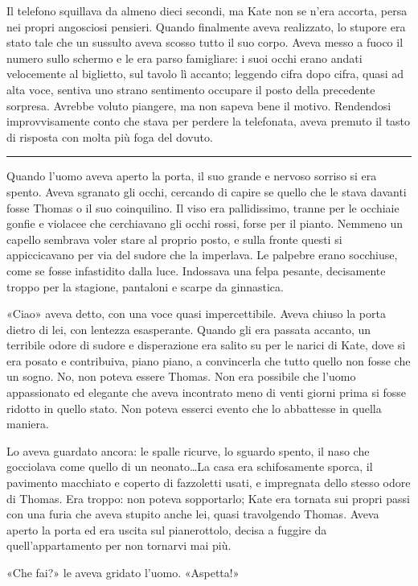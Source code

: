 \documentclass[a4paper,oneside,11pt]{memoir}
\begin{document}
Il telefono squillava da almeno dieci secondi, ma Kate non se n'era accorta,
persa nei propri angosciosi pensieri. Quando finalmente aveva realizzato, lo
stupore era stato tale che un sussulto aveva scosso tutto il suo corpo. Aveva
messo a fuoco il numero sullo schermo e le era parso famigliare: i suoi occhi
erano andati velocemente al biglietto, sul tavolo lì accanto; leggendo cifra
dopo cifra, quasi ad alta voce, sentiva uno strano sentimento occupare il posto
della precedente sorpresa. Avrebbe voluto piangere, ma non sapeva bene il
motivo. Rendendosi improvvisamente conto che stava per perdere la telefonata,
aveva premuto il tasto di risposta con molta più foga del dovuto.

\plainbreak{1}

Quando l'uomo aveva aperto la porta, il suo grande e nervoso sorriso si era
spento. Aveva sgranato gli occhi, cercando di capire se quello che le stava
davanti fosse Thomas o il suo coinquilino. Il viso era pallidissimo, tranne per
le occhiaie gonfie e violacee che cerchiavano gli occhi rossi, forse per il
pianto. Nemmeno un capello sembrava voler stare al proprio posto, e sulla fronte
questi si appiccicavano per via del sudore che la imperlava. Le palpebre erano
socchiuse, come se fosse infastidito dalla luce. Indossava una felpa pesante,
decisamente troppo per la stagione, pantaloni e scarpe da ginnastica.

«Ciao» aveva detto, con una voce quasi impercettibile. Aveva chiuso la porta
dietro di lei, con lentezza esasperante. Quando gli era passata accanto, un
terribile odore di sudore e disperazione era salito su per le narici di Kate,
dove si era posato e contribuiva, piano piano, a convincerla che tutto quello
non fosse che un sogno. No, non poteva essere Thomas. Non era possibile che
l'uomo appassionato ed elegante che aveva incontrato meno di venti giorni prima
si fosse ridotto in quello stato. Non poteva esserci evento che lo abbattesse in
quella maniera.

Lo aveva guardato ancora: le spalle ricurve, lo sguardo spento, il naso che
gocciolava come quello di un neonato\dots La casa era schifosamente sporca, il
pavimento macchiato e coperto di fazzoletti usati, e impregnata dello stesso
odore di Thomas. Era troppo: non poteva sopportarlo; Kate era tornata sui propri
passi con una furia che aveva stupito anche lei, quasi travolgendo Thomas. Aveva
aperto la porta ed era uscita sul pianerottolo, decisa a fuggire da
quell'appartamento per non tornarvi mai più.

«Che fai?» le aveva gridato l'uomo. «Aspetta!»
\end{document}
